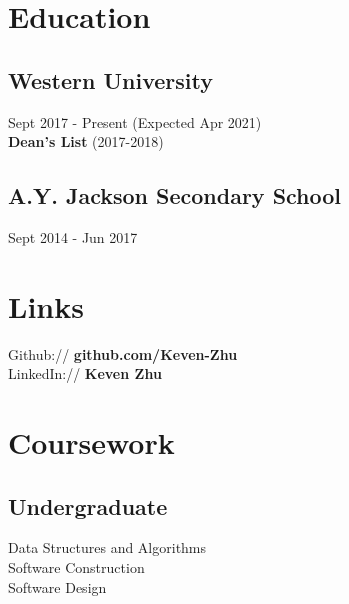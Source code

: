\documentclass[]{Resume_template}
\begin{document}
%
%

%
%

\begin{minipage}[t]{0.33\textwidth} 


\section{Education} 

\subsection{Western University}
Sept 2017 - Present (Expected Apr 2021) \\
{\bf Dean's List} (2017-2018)
\sectionsep


\subsection{A.Y. Jackson Secondary School}
Sept 2014 - Jun 2017


\section{Links} 
Github:// {\bf github.com/Keven-Zhu} \\
LinkedIn:// {\bf Keven Zhu} \\


\section{Coursework}

\subsection{Undergraduate}
Data Structures and Algorithms \\
Software Construction \\
Software Design \\


\end{minipage}
\end{document}
